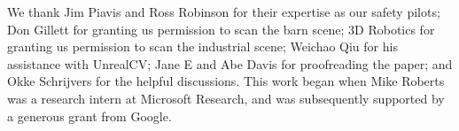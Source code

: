 We thank Jim Piavis and Ross Robinson for their expertise as our safety pilots;
Don Gillett for granting us permission to scan the barn scene;
3D Robotics for granting us permission to scan the industrial scene;
Weichao Qiu for his assistance with UnrealCV;
Jane E and Abe Davis for proofreading the paper;
and Okke Schrijvers for the helpful discussions.
This work began when Mike Roberts was a research intern at Microsoft Research, and was subsequently supported by a generous grant from Google.


